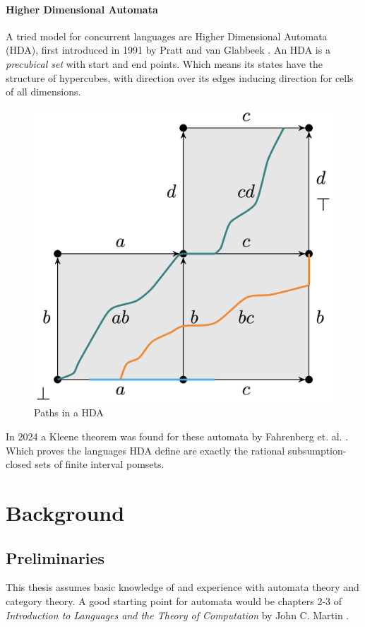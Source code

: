 \documentclass[12pt]{article}
\theoremstyle{definition}
\newcommand{\1}{\mathbbm{1}}
\begin{document}
\paragraph{Higher Dimensional Automata}
A tried model for concurrent languages are Higher Dimensional Automata (HDA), first introduced in 1991 by Pratt and van Glabbeek \cite{Pra91, vG91}. An HDA is a \emph{precubical set} with start and end points. Which means its states have the structure of hypercubes, with direction over its edges inducing direction for cells of all dimensions.
\begin{figure}[H]
    \centering
    \includegraphics[width=0.5\linewidth]{HDA_paths.png}
    \caption{Paths in a HDA}
    \label{fig:HDA_paths}
\end{figure}

In 2024 a Kleene theorem was found for these automata by Fahrenberg et. al. \cite{Fahr_2024}. Which proves the languages HDA define are exactly the rational subsumption-closed sets of finite interval pomsets.

\newpage
\section{Background}
\subsection{Preliminaries}
This thesis assumes basic knowledge of and experience with automata theory and category theory. A good starting point for automata would be chapters 2-3 of \emph{Introduction to Languages and the Theory of Computation} by John C. Martin \cite{Martin_2011}.
\end{document}
